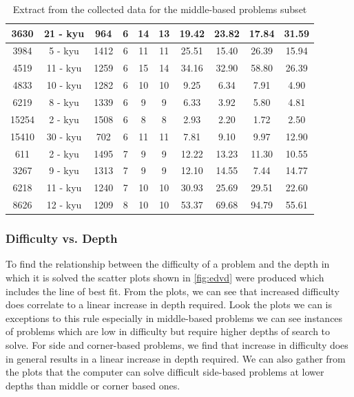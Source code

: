\documentclass{l4proj}
\begin{document}
\begin{table}[!ht]
\begin{tabular}{|c|c|c|c|c|c|c|c|c|c|}
3630 & 21 - kyu & 964 & 6 & 14 & 13 & 19.42 & 23.82 & 17.84 & 31.59 \\ \hline
3984 & 5 - kyu & 1412 & 6 & 11 & 11 & 25.51 & 15.40 & 26.39 & 15.94 \\ \hline
4519 & 11 - kyu & 1259 & 6 & 15 & 14 & 34.16 & 32.90 & 58.80 & 26.39 \\ \hline
4833 & 10 - kyu & 1282 & 6 & 10 & 10 & 9.25 & 6.34 & 7.91 & 4.90 \\ \hline
6219 & 8 - kyu & 1339 & 6 & 9 & 9 & 6.33 & 3.92 & 5.80 & 4.81 \\ \hline
15254 & 2 - kyu & 1508 & 6 & 8 & 8 & 2.93 & 2.20 & 1.72 & 2.50 \\ \hline
15410 & 30 - kyu & 702 & 6 & 11 & 11 & 7.81 & 9.10 & 9.97 & 12.90 \\ \hline
611 & 2 - kyu & 1495 & 7 & 9 & 9 & 12.22 & 13.23 & 11.30 & 10.55 \\ \hline
3267 & 9 - kyu & 1313 & 7 & 9 & 9 & 12.10 & 14.55 & 7.44 & 14.77 \\ \hline
6218 & 11 - kyu & 1240 & 7 & 10 & 10 & 30.93 & 25.69 & 29.51 & 22.60 \\ \hline
8626 & 12 - kyu & 1209 & 8 & 10 & 10 & 53.37 & 69.68 & 94.79 & 55.61 \\ \hline

\end{tabular}
\caption{Extract from the collected data for the middle-based problems subset}
\label{table:extract-middle}
\end{table}




\subsubsection{Difficulty vs. Depth}

To find the relationship between the difficulty of a problem and the depth in which it is solved the scatter plots shown in \autoref{fig:edvd} were produced which includes the line of best fit. From the plots, we can see that increased difficulty does correlate to a linear increase in depth required. Look the plots we can is exceptions to this rule especially in middle-based problems we can see instances of problems which are low in difficulty but require higher depths of search to solve. For side and corner-based problems, we find that increase in difficulty does in general results in a linear increase in depth required. We can also gather from the plots that the computer can solve difficult side-based problems at lower depths than middle or corner based ones.
\end{document}
